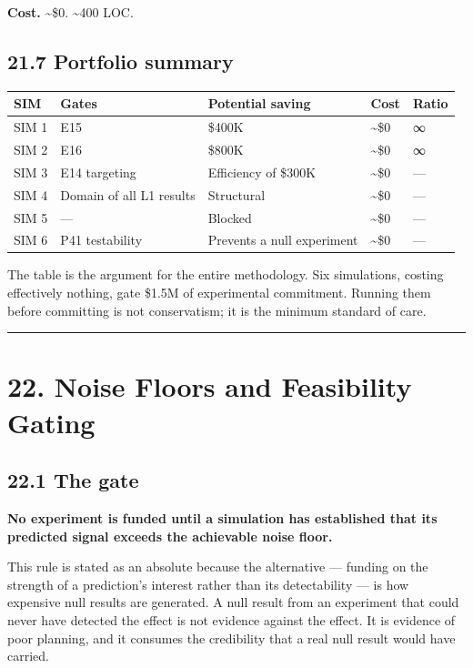 \documentclass[
  11pt]{report}
\begin{document}
\textbf{Cost.} \textasciitilde\$0. \textasciitilde400 LOC.

\hypertarget{portfolio-summary}{%
\section{21.7 Portfolio summary}\label{portfolio-summary}}

\begin{longtable}[]{@{}lllll@{}}
\toprule\noalign{}
SIM & Gates & Potential saving & Cost & Ratio \\
\midrule\noalign{}
\endhead
\bottomrule\noalign{}
\endlastfoot
SIM 1 & E15 & \$400K & \textasciitilde\$0 & ∞ \\
SIM 2 & E16 & \$800K & \textasciitilde\$0 & ∞ \\
SIM 3 & E14 targeting & Efficiency of \$300K & \textasciitilde\$0 &
--- \\
SIM 4 & Domain of all L1 results & Structural & \textasciitilde\$0 &
--- \\
SIM 5 & --- & Blocked & \textasciitilde\$0 & --- \\
SIM 6 & P41 testability & Prevents a null experiment &
\textasciitilde\$0 & --- \\
\end{longtable}

The table is the argument for the entire methodology. Six simulations,
costing effectively nothing, gate \$1.5M of experimental commitment.
Running them before committing is not conservatism; it is the minimum
standard of care.

\begin{center}\rule{0.5\linewidth}{0.5pt}\end{center}

\hypertarget{noise-floors-and-feasibility-gating}{%
\chapter{22. Noise Floors and Feasibility
Gating}\label{noise-floors-and-feasibility-gating}}

\hypertarget{the-gate}{%
\section{22.1 The gate}\label{the-gate}}

\textbf{No experiment is funded until a simulation has established that
its predicted signal exceeds the achievable noise floor.}

This rule is stated as an absolute because the alternative --- funding
on the strength of a prediction's interest rather than its detectability
--- is how expensive null results are generated. A null result from an
experiment that could never have detected the effect is not evidence
against the effect. It is evidence of poor planning, and it consumes the
credibility that a real null result would have carried.
\end{document}
